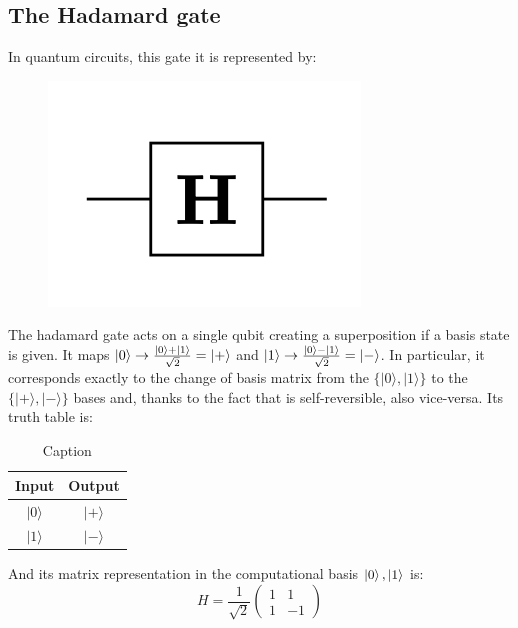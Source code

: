 \subsection*{The Hadamard gate}
In quantum circuits, this gate it is represented by:
\begin{figure}[H]
\centering
\includegraphics{Mainmatter/images/Hadamard_GAte.png}
\end{figure}
The hadamard gate acts on a single qubit creating a superposition if a basis state is given. It maps $\ket{0} \to \frac{\ket{0} + \ket{1}}{\sqrt{2}} = \ket{+}$  and  $\ket{1} \to \frac{\ket{0} - \ket{1}}{\sqrt{2}} = \ket{-}$. 
In particular, it corresponds exactly to the change of basis matrix from the $\{|0\rangle,|1\rangle\}$ to the $\{|+\rangle,|-\rangle\}$ bases and, thanks to the fact that is self-reversible, also vice-versa. Its truth table is: 
\begin{table}[h!]
    \centering
    \begin{tabular}{cc}
\hline Input & Output \\
\hline$|0\rangle$ & $|+\rangle$ \\
$|1\rangle$ & $|-\rangle$ \\
\hline
\end{tabular}
    \caption{Caption}
    \label{tab:my_label}
\end{table}

And its matrix representation in the computational basis $\ket{0},\ket{1}$ is: 
\begin{equation*}
    H = \frac{1}{\sqrt{2}} \left(\begin{array}{cc}
1 & 1 \\
1 & -1
\end{array}\right)  
\end{equation*}


